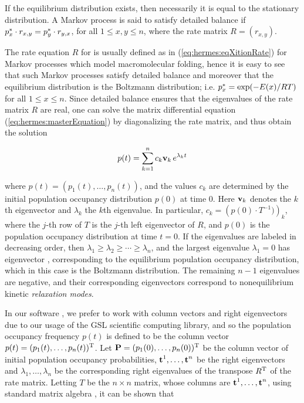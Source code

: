 If the equilibrium distribution exists, then necessarily it is equal to
the stationary distribution. A Markov process is said
to satisfy detailed balance if $p^*_x \cdot r_{x,y} = p^*_y \cdot r_{y,x}$,
for all $1 \leq x,y \leq n$, where the rate matrix $R = (r_{x,y})$.

The rate equation $R$ for is usually defined
as in (\ref{eq:hermes:eqXitionRate}) for
Markov processes which model macromolecular folding,
hence it is easy to see that
such Markov processes satisfy detailed balance and moreover that
the equilibrium distribution is the
Boltzmann distribution; i.e.  $p^*_x = \exp(-E(x)/RT)$ for
all $1 \leq x \leq n$.
Since detailed balance ensures that the eigenvalues of the rate matrix $R$ are
real, one can solve the matrix differential equation
(\ref{eq:hermes:masterEquation}) by diagonalizing the rate matrix, and thus obtain
the solution

\begin{align}
\label{eq:hermes:populationOccupancyEquation}
p(t) = \sum_{k=1}^n c_k {\bf v}_k\, e^{\lambda_k t}
\end{align}

where $p(t) = (p_1(t),\dots,p_n(t))$, and the
values $c_k$ are determined by the initial population occupancy
distribution $p(0)$ at time 0. Here
${\bf v}_k$ denotes the $k$th eigenvector and
$\lambda_k$ the $k$th eigenvalue. In particular,
$c_k = \left(p(0) \cdot T^{-1})\right)_k$, where the $j$-th row of $T$
is the $j$-th left eigenvector of $R$,
and $p(0)$ is the population occupancy distribution
at time $t=0$. If the eigenvalues are labeled in decreasing
order, then $\lambda_1 \geq \lambda_2 \geq \cdots \geq \lambda_n$,
and the largest eigenvalue $\lambda_1=0$ has eigenvector \pSt, corresponding
to the equilibrium population occupancy distribution, which in this case
is the Boltzmann distribution. The
remaining $n-1$ eigenvalues are negative, and their corresponding eigenvectors
correspond to nonequilibrium kinetic {\em relaxation modes}.

In our software \hermes, we prefer to work with column vectors and
right eigenvectors due to our usage of the GSL scientific computing library,
and so the population occupancy frequency
$p(t)$ is defined to be the column vector
$p(t)=(p_1(t),\dots,p_n(t))^{\text T}$. Let
$\mbox{\bf P} = (p_1(0),\dots,p_n(0))^{\text T}$ be the column vector of initial
population occupancy probabilities,
$\mbox{\bf t}^1,\dots,\mbox{\bf t}^n$ be the right eigenvectors and
$\lambda_1,\dots,\lambda_n$ be the corresponding right eigenvalues of the
transpose $R^{\text T}$ of the rate matrix.
Letting $T$ be the $n\times n$ matrix, whose columns are
$\mbox{\bf t}^1,\dots,\mbox{\bf t}^n$, using standard matrix algebra
\citep{matrixtheory}, it can be shown that

